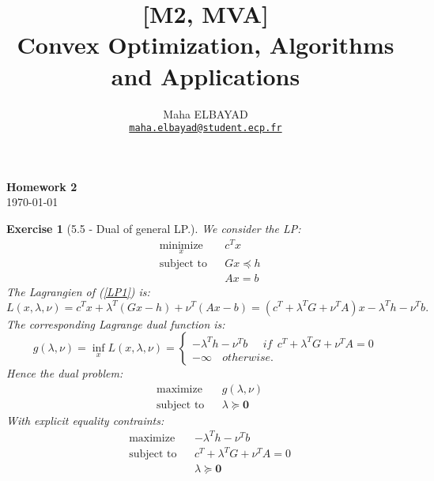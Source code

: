 \documentclass[11pt]{article}
\title{[M2, MVA]\\ Convex Optimization, Algorithms and Applications}
\author{Maha ELBAYAD\\ \href{mailto:maha.elbayad@student.ecp.fr}{\tt maha.elbayad@student.ecp.fr}}
\date{}
\theoremstyle{exo}
\newtheorem*{exercise}{Exercise}
\newcommand{\1}{\mathbf{1}}
\newcommand{\0}{\mathbf{0}}
\begin{document}
\maketitle
\vspace{-10pt}
\begin{center}
{\huge \bf Homework 2}\\
\today
\vspace{15pt}
\end{center}

\vspace{10pt}


\begin{exercise}[5.5 - Dual of general LP.]
We consider the LP:
\begin{equation}
\label{LP1}
\begin{aligned}
& \underset{x}{\text{minimize}} & & c^Tx \\
& \text{subject to} & & Gx\preceq h\\
& & & Ax=b
\end{aligned}
\end{equation}
The Lagrangien of (\ref{LP1}) is:
\[
L(x,\lambda,\nu)=c^Tx+\lambda^T(Gx-h)+\nu^T(Ax-b)=(c^T+\lambda^TG+\nu^TA)x-\lambda^Th-\nu^Tb.
\] 
The corresponding Lagrange dual function is:
\[
g(\lambda,\nu)=\inf_xL(x,\lambda,\nu)=\begin{cases}
-\lambda^Th-\nu^Tb\phantom{abc}if\:\:c^T+\lambda^TG+\nu^TA=0\\
-\infty\phantom{ab}otherwise.
\end{cases}
\]
Hence the dual problem:
\begin{equation*}
\begin{aligned}
& {\text{maximize}} & & g(\lambda,\nu)  \\
& \text{subject to} & & \lambda\succeq \0
\end{aligned}
\end{equation*}
With explicit equality contraints:
\begin{equation*}
\begin{aligned}
& {\text{maximize}} & & -\lambda^Th-\nu^Tb  \\
& \text{subject to} & & c^T+\lambda^TG+\nu^TA=0\\
& & & \lambda\succeq \0
\end{aligned}
\end{equation*}
\end{exercise}
\end{document}
